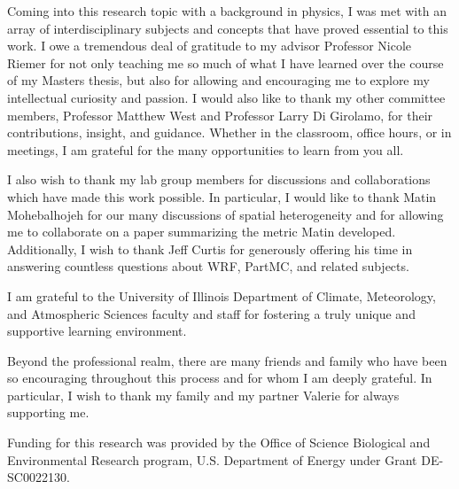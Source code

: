 \begin{acknowledgments}

Coming into this research topic with a background in physics, I was met with an array of interdisciplinary subjects and concepts that have proved essential to this work. I owe a tremendous deal of gratitude to my advisor Professor Nicole Riemer for not only teaching me so much of what I have learned over the course of my Masters thesis, but also for allowing and encouraging me to explore my intellectual curiosity and passion. I would also like to thank my other committee members, Professor Matthew West and Professor Larry Di Girolamo, for their contributions, insight, and guidance. Whether in the classroom, office hours, or in meetings, I am grateful for the many opportunities to learn from you all. 

I also wish to thank my lab group members for discussions and collaborations which have made this work possible. In particular, I would like to thank Matin Mohebalhojeh for our many discussions of spatial heterogeneity and for allowing me to collaborate on a paper summarizing the metric Matin developed. Additionally, I wish to thank Jeff Curtis for generously offering his time in answering countless questions about WRF, PartMC, and related subjects. 

I am grateful to the University of Illinois Department of Climate, Meteorology, and Atmospheric Sciences faculty and staff for fostering a truly unique and supportive learning environment. 

Beyond the professional realm, there are many friends and family who have been so encouraging throughout this process and for whom I am deeply grateful. In particular, I wish to thank my family and my partner Valerie for always supporting me.  

Funding for this research was provided by the Office of Science Biological and Environmental Research program, U.S. Department of Energy under Grant DE-SC0022130. 

\end{acknowledgments}
